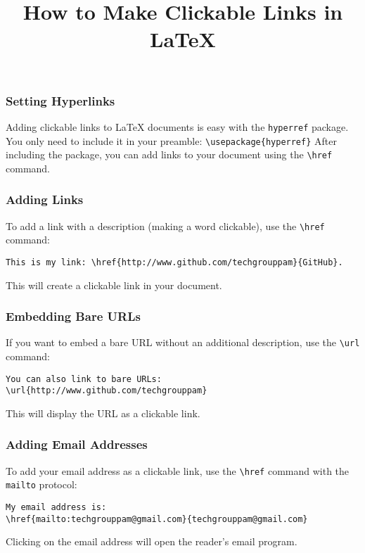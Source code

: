 \documentclass{beamer}
\title{How to Make Clickable Links in \LaTeX}
\begin{document}
\begin{frame}
  \titlepage
\end{frame}

\begin{frame}
\frametitle{Setting Hyperlinks}
Adding clickable links to \LaTeX{} documents is easy with the \texttt{hyperref} package. You only need to include it in your preamble:
\vspace{1em}
\texttt{\textbackslash usepackage\{hyperref\}}
\vspace{1em}
After including the package, you can add links to your document using the \texttt{\textbackslash href} command.
\end{frame}

\begin{frame}[fragile]
\frametitle{Adding Links}
To add a link with a description (making a word clickable), use the \texttt{\textbackslash href} command:
\vspace{1em}
\begin{verbatim}
This is my link: \href{http://www.github.com/techgrouppam}{GitHub}.
\end{verbatim}
\vspace{1em}
This will create a clickable link in your document.
\end{frame}

\begin{frame}[fragile]
\frametitle{Embedding Bare URLs}
If you want to embed a bare URL without an additional description, use the \texttt{\textbackslash url} command:
\vspace{1em}
\begin{verbatim}
You can also link to bare URLs: \url{http://www.github.com/techgrouppam}
\end{verbatim}
\vspace{1em}
This will display the URL as a clickable link.
\end{frame}

\begin{frame}[fragile]
\frametitle{Adding Email Addresses}
To add your email address as a clickable link, use the \texttt{\textbackslash href} command with the \texttt{mailto} protocol:
\vspace{1em}
\begin{verbatim}
My email address is:
\href{mailto:techgrouppam@gmail.com}{techgrouppam@gmail.com}
\end{verbatim}
\vspace{1em}
Clicking on the email address will open the reader's email program.
\end{frame}
\end{document}
